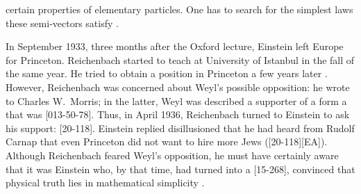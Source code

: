 \documentclass[draft]{article}
\begin{document}
certain properties of elementary particles. One has to search for the simplest laws these semi-vectors satisfy \citep[168]{Einstein1933}.

In September 1933, three months after the Oxford lecture, Einstein left Europe for Princeton. Reichenbach started to teach at University of Istanbul in the fall of the same year. He tried to obtain a position in Princeton a few years later \citep{Verhaegh2020a}. However, Reichenbach was concerned about Weyl's possible opposition:  he wrote to Charles W.\ Morris; in the latter, Weyl was described a supporter of a form a  that was  [013-50-78].  Thus, in April 1936, Reichenbach turned to Einstein to ask his support:  [20-118]. Einstein replied disillusioned that he had heard from Rudolf Carnap that even Princeton did not want to hire more Jews ([20-118][EA]). Although Reichenbach feared Weyl's opposition, he must have certainly aware that it was Einstein who, by that time, had turned into a  [15-268], convinced that physical truth lies in mathematical simplicity \citep{Ryckman2014}.  





\end{document}
